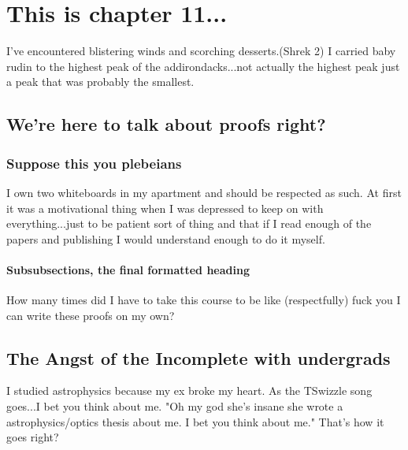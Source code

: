 \chapter{This is chapter 11...}

I've encountered blistering winds and scorching desserts.(Shrek 2) I carried baby rudin to the highest peak of the addirondacks...not actually the highest peak just a peak that was probably the smallest.  

\section[Shorter Title]{We're here to talk about proofs right?}



\subsection{Suppose this you plebeians}

I own two whiteboards in my apartment and should be respected as such. At first it was a motivational thing when I was depressed to keep on with everything...just to be patient sort of thing and that if I read enough of the papers and publishing I would understand enough to do it myself. 

\subsubsection{Subsubsections, the final formatted heading}

How many times did I have to take this course to be like (respectfully) fuck you I can write these proofs on my own?

\section{The Angst of the Incomplete with undergrads}

I studied astrophysics because my ex broke my heart. As the TSwizzle song goes...I bet you think about me. "Oh my god she's insane she wrote a astrophysics/optics thesis about me. I bet you think about me." That's how it goes right?